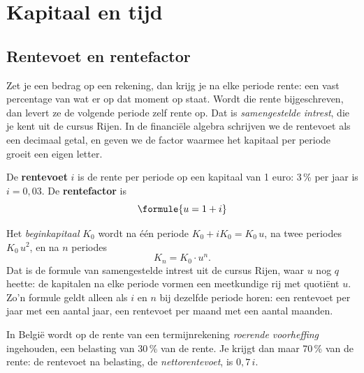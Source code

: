\begin{oefeningen}[Start]

\end{oefeningen}


\section{Kapitaal en tijd}

\subsection{Rentevoet en rentefactor}

Zet je een bedrag op een rekening, dan krijg je na elke periode rente: een vast percentage van wat er op dat moment op staat. Wordt die rente bijgeschreven, dan levert ze de volgende periode zelf rente op. Dat is \textit{samengestelde intrest}, die je kent uit de cursus Rijen. In de financiële algebra schrijven we de rentevoet als een decimaal getal, en geven we de factor waarmee het kapitaal per periode groeit een eigen letter.

\begin{theorie}
De \textbf{\textcolor{accent}{rentevoet}} $i$ is de rente per periode op een kapitaal van 1 euro: 3\,\% per jaar is $i = 0{,}03$. De \textbf{\textcolor{accent}{rentefactor}} is
\[
\formule{u = 1 + i}
\]
\end{theorie}

Het \textit{beginkapitaal} $K_0$ wordt na één periode $K_0 + i K_0 = K_0\,u$, na twee periodes $K_0\,u^2$, en na $n$ periodes
\[
K_n = K_0 \cdot u^n .
\]
Dat is de formule van samengestelde intrest uit de cursus Rijen, waar $u$ nog $q$ heette: de kapitalen na elke periode vormen een meetkundige rij met quotiënt $u$. Zo'n formule geldt alleen als $i$ en $n$ bij dezelfde periode horen: een rentevoet per jaar met een aantal jaar, een rentevoet per maand met een aantal maanden.

In België wordt op de rente van een termijnrekening \textit{roerende voorheffing} ingehouden, een belasting van 30\,\% van de rente. Je krijgt dan maar 70\,\% van de rente: de rentevoet na belasting, de \textit{nettorentevoet}, is $0{,}7\,i$.

